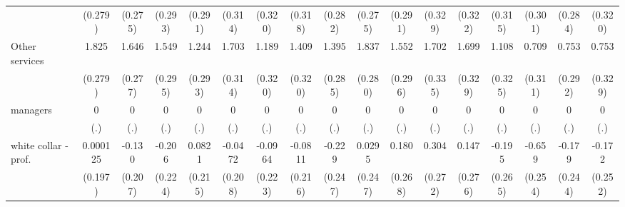 {\begin{tabular}{l*{16}{c}}
                    &     (0.279)         &     (0.275)         &     (0.293)         &     (0.291)         &     (0.314)         &     (0.320)         &     (0.318)         &     (0.282)         &     (0.275)         &     (0.291)         &     (0.329)         &     (0.322)         &     (0.315)         &     (0.301)         &     (0.284)         &     (0.320)         \\
[1em]
Other services      &       1.825\sym{***}&       1.646\sym{***}&       1.549\sym{***}&       1.244\sym{***}&       1.703\sym{***}&       1.189\sym{***}&       1.409\sym{***}&       1.395\sym{***}&       1.837\sym{***}&       1.552\sym{***}&       1.702\sym{***}&       1.699\sym{***}&       1.108\sym{***}&       0.709\sym{*}  &       0.753\sym{**} &       0.753\sym{*}  \\
                    &     (0.279)         &     (0.277)         &     (0.295)         &     (0.293)         &     (0.314)         &     (0.320)         &     (0.320)         &     (0.285)         &     (0.280)         &     (0.296)         &     (0.335)         &     (0.329)         &     (0.325)         &     (0.311)         &     (0.292)         &     (0.329)         \\
[1em]
managers            &           0         &           0         &           0         &           0         &           0         &           0         &           0         &           0         &           0         &           0         &           0         &           0         &           0         &           0         &           0         &           0         \\
                    &         (.)         &         (.)         &         (.)         &         (.)         &         (.)         &         (.)         &         (.)         &         (.)         &         (.)         &         (.)         &         (.)         &         (.)         &         (.)         &         (.)         &         (.)         &         (.)         \\
[1em]
white collar - prof.&    0.000125         &      -0.130         &      -0.206         &      0.0821         &     -0.0472         &     -0.0964         &     -0.0811         &      -0.229         &      0.0295         &       0.180         &       0.304         &       0.147         &      -0.195         &      -0.659\sym{**} &      -0.179         &      -0.172         \\
                    &     (0.197)         &     (0.207)         &     (0.224)         &     (0.215)         &     (0.208)         &     (0.223)         &     (0.216)         &     (0.247)         &     (0.247)         &     (0.268)         &     (0.272)         &     (0.276)         &     (0.265)         &     (0.254)         &     (0.244)         &     (0.252)         \\

\end{tabular}}
